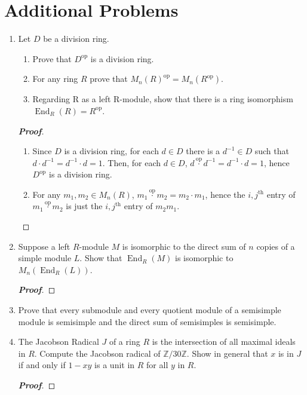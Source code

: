 \documentclass[12pt,leqno]{book}
\theoremstyle{definition}
\newcommand{\End}{\operatorname{End}}
\newcommand{\Z}{\mathbb{Z}}
\newenvironment{Proof}{\begin{proof}[\textnormal{\textbf{Proof}}]}{\end{proof}}
\begin{document}
\section*{Additional Problems}
\begin{enumerate}
 \item Let $D$ be a division ring. 
  \begin{enumerate}
   \item Prove that $D^{\text{op}}$ is a division ring.   
   \item For any ring $R$ prove that $M_n(R)^{\text{op}}=M_n(R^{\text{op}})$.
   \item Regarding R as a left R-module, show that there is a ring isomorphism $\End_R(R)=R^{\text{op}}$.
  \end{enumerate}

\begin{Proof}
 \begin{enumerate}
  \item Since $D$ is a division ring, for each $d\in D$ there is a $d^{-1}\in D$ such that $d\cdot d^{-1}=d^{-1}\cdot d=1$. Then, for each $d\in D$, $d\stackrel{\text{op}}{\cdot}d^{-1}=d^{-1}\cdot d=1$, hence $D^{\text{op}}$ is a division ring.
  \item For any $m_1,m_2\in M_n(R)$, $m_1\stackrel{\text{op}}{\cdot}m_2=m_2\cdot m_1$, hence the $i,j^{\text{th}}$ entry of $m_1\stackrel{\text{op}}{\cdot}m_2$ is just the $i,j^{\text{th}}$ entry of $m_2m_1$. 
 \end{enumerate}

\end{Proof}

 \item Suppose a left $R$-module $M$ is isomorphic to the direct sum of $n$ copies of a simple module $L$. Show that $\End_R(M)$ is isomorphic to $M_n(\End_R(L))$. 

\begin{Proof}
 
\end{Proof}


 \item Prove that every submodule and every quotient module of a semisimple module is semisimple and the direct sum of semisimples is semisimple. 

 \item The Jacobson Radical $J$ of a ring $R$ is the intersection of all maximal ideals in $R$. Compute the Jacobson radical of $\Z/30\Z$. Show in general that $x$ is in $J$ if and only if $1-xy$ is a unit in $R$ for all $y$ in $R$.

\begin{Proof}

\end{Proof}
 
\end{enumerate}
\end{document}
